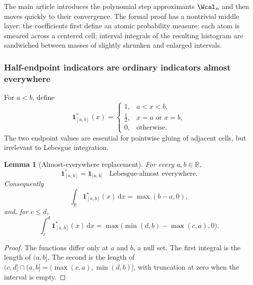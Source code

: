 \documentclass[11pt,oneside]{article}
\newtheorem{lemma}[lemma]{Lemma}
\theoremstyle{definition}
\theoremstyle{remark}
\newcommand{\R}{\mathbb R}
\newcommand{\dd}{\,\mathrm d}
\begin{document}
The main article introduces the polynomial step approximants $\Wcal_n$ and then moves quickly
to their convergence.  The formal proof has a nontrivial middle layer: the coefficients first
define an atomic probability measure; each atom is smeared across a centered cell; interval
integrals of the resulting histogram are sandwiched between masses of slightly shrunken and
enlarged intervals.

\subsubsection{Half-endpoint indicators are ordinary indicators almost everywhere}

For $a<b$, define
\begin{equation}
 \mathbf1_{[a,b]}^*(x)=
 \begin{cases}
  1,&a<x<b,\\
  \tfrac12,&x=a\text{ or }x=b,\\
  0,&\text{otherwise}.
 \end{cases}
 \label{integration:eq:half-endpoint-indicator}
\end{equation}
The two endpoint values are essential for pointwise gluing of adjacent cells, but irrelevant
to Lebesgue integration.

\begin{lemma}[Almost-everywhere replacement]
\label{integration:lem:half-indicator-ae}
For every $a,b\in\R$,
\begin{equation}
 \mathbf1_{[a,b]}^*=\mathbf1_{(a,b]}
 \quad\text{Lebesgue-almost everywhere}.
 \label{integration:eq:half-indicator-ae}
\end{equation}
Consequently
\begin{equation}
 \int_\R\mathbf1_{[a,b]}^*(x)\dd x=\max(b-a,0),
 \label{integration:eq:half-indicator-total-integral}
\end{equation}
and, for $c\le d$,
\begin{equation}
 \int_c^d\mathbf1_{[a,b]}^*(x)\dd x
 =\max\bigl(\min(d,b)-\max(c,a),0\bigr).
 \label{integration:eq:half-indicator-overlap}
\end{equation}
\end{lemma}

\begin{proof}
The functions differ only at $a$ and $b$, a null set.  The first integral is the length of
$(a,b]$.  The second is the length of
$(c,d]\cap(a,b]=(\max(c,a),\min(d,b)]$, with truncation at zero when the interval is empty.
\end{proof}
\end{document}
